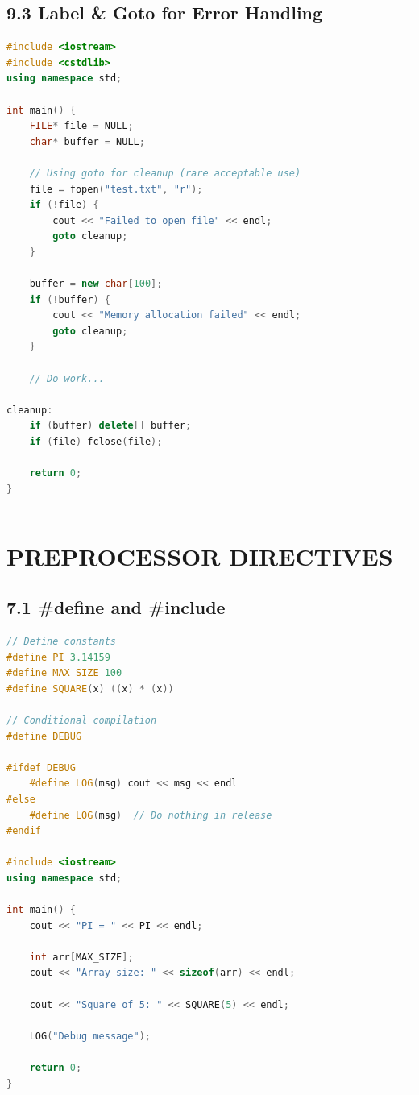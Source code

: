 \hypertarget{label-goto-for-error-handling}{%
\section{9.3 Label \& Goto for Error
Handling}\label{label-goto-for-error-handling}}

\begin{lstlisting}[language={C++}]
#include <iostream>
#include <cstdlib>
using namespace std;

int main() {
    FILE* file = NULL;
    char* buffer = NULL;
    
    // Using goto for cleanup (rare acceptable use)
    file = fopen("test.txt", "r");
    if (!file) {
        cout << "Failed to open file" << endl;
        goto cleanup;
    }
    
    buffer = new char[100];
    if (!buffer) {
        cout << "Memory allocation failed" << endl;
        goto cleanup;
    }
    
    // Do work...
    
cleanup:
    if (buffer) delete[] buffer;
    if (file) fclose(file);
    
    return 0;
}
\end{lstlisting}

\begin{center}\rule{0.5\linewidth}{0.5pt}\end{center}

\hypertarget{preprocessor-directives}{%
\chapter{PREPROCESSOR DIRECTIVES}\label{preprocessor-directives}}

\hypertarget{define-and-include}{%
\section{7.1 \#define and \#include}\label{define-and-include}}

\begin{lstlisting}[language={C++}]
// Define constants
#define PI 3.14159
#define MAX_SIZE 100
#define SQUARE(x) ((x) * (x))

// Conditional compilation
#define DEBUG

#ifdef DEBUG
    #define LOG(msg) cout << msg << endl
#else
    #define LOG(msg)  // Do nothing in release
#endif

#include <iostream>
using namespace std;

int main() {
    cout << "PI = " << PI << endl;
    
    int arr[MAX_SIZE];
    cout << "Array size: " << sizeof(arr) << endl;
    
    cout << "Square of 5: " << SQUARE(5) << endl;
    
    LOG("Debug message");
    
    return 0;
}
\end{lstlisting}

